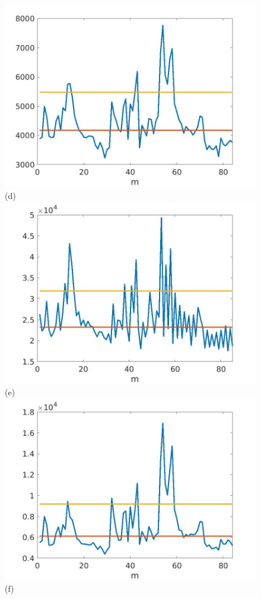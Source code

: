 \documentclass[journal]{IEEEtran}
\begin{document}
\begin{figure}[htp!]
\includegraphics[scale=.12]{../../figs/consecdif_J2_VH_squared_meandev}(d)\\
\includegraphics[scale=.12]{../../figs/J3_VH_squared_meandev}(e)
\includegraphics[scale=.12]{../../figs/consecdif_J3_VH_squared_meandev}(f)\\

\end{figure}
\end{document}
